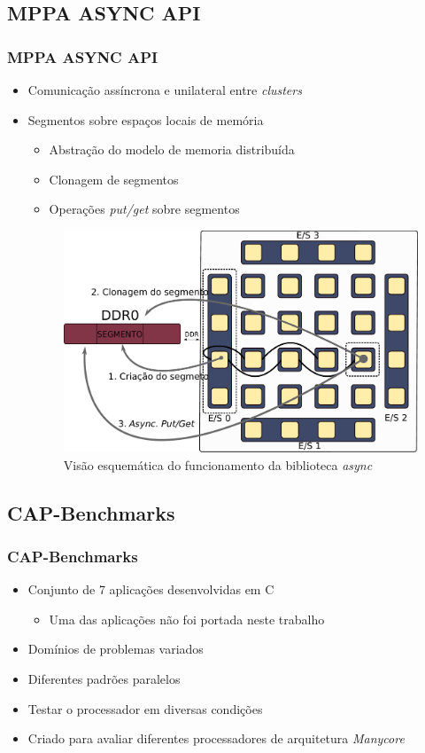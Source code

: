 \documentclass[xcolor={table}]{beamer}
\begin{document}
\subsection{MPPA ASYNC API}
\begin{frame}\frametitle{MPPA ASYNC API \cite{Hascoet2017}}
    \begin{itemize}
        \item {Comunicação assíncrona e unilateral entre \textit{clusters}}
        \item {Segmentos sobre espaços locais de memória}
        \begin{itemize}
            \item Abstração do modelo de memoria distribuída
            \item Clonagem de segmentos
            \item Operações \textit{put/get} sobre segmentos
        \end{itemize}
        \begin{figure}
            \centering
            \includegraphics[width=.6\linewidth, keepaspectratio]{figs/putget.pdf}
            \caption{Visão esquemática do funcionamento da biblioteca \textit{async}}
            \label{fig:putget}
        \end{figure}
    \end{itemize}
\end{frame}

\subsection{CAP-Benchmarks}
\begin{frame}\frametitle{CAP-Benchmarks \cite{Castro-Souza-CCPE:2016}}
    \begin{itemize}
        \item {Conjunto de 7 aplicações desenvolvidas em C}
        \begin{itemize}
            \item {Uma das aplicações não foi portada neste trabalho}
        \end{itemize}
    	\item {Domínios de problemas variados}
    	\item {Diferentes padrões paralelos}
    	\item {Testar o processador em diversas condições}
        \item {Criado para avaliar diferentes processadores de arquitetura \textit{Manycore}}
    \end{itemize}
\end{frame}
\end{document}
